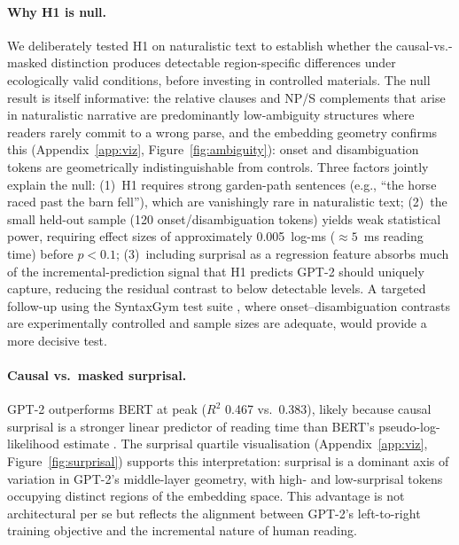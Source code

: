 \documentclass[11pt]{article}
\begin{document}
\paragraph{Why H1 is null.}
We deliberately tested H1 on naturalistic text to establish whether the causal-vs.-masked distinction produces detectable region-specific differences under ecologically valid conditions, before investing in controlled materials.
The null result is itself informative: the relative clauses and NP/S complements that arise in naturalistic narrative are predominantly low-ambiguity structures where readers rarely commit to a wrong parse, and the embedding geometry confirms this (Appendix~\ref{app:viz}, Figure~\ref{fig:ambiguity}): onset and disambiguation tokens are geometrically indistinguishable from controls.
Three factors jointly explain the null:
(1)~H1 requires strong garden-path sentences (e.g., ``the horse raced past the barn fell''), which are vanishingly rare in naturalistic text;
(2)~the small held-out sample (120 onset/disambiguation tokens) yields weak statistical power, requiring effect sizes of approximately 0.005~log-ms (${\approx}5$~ms reading time) before $p < 0.1$;
(3)~including surprisal as a regression feature absorbs much of the incremental-prediction signal that H1 predicts GPT-2 should uniquely capture, reducing the residual contrast to below detectable levels.
A targeted follow-up using the SyntaxGym test suite \citep{gauthier2020}, where onset--disambiguation contrasts are experimentally controlled and sample sizes are adequate, would provide a more decisive test.

\paragraph{Causal vs.\ masked surprisal.}
GPT-2 outperforms BERT at peak ($R^2$ 0.467 vs.\ 0.383), likely because causal surprisal is a stronger linear predictor of reading time than BERT's pseudo-log-likelihood estimate \citep{salazar2020}.
The surprisal quartile visualisation (Appendix~\ref{app:viz}, Figure~\ref{fig:surprisal}) supports this interpretation: surprisal is a dominant axis of variation in GPT-2's middle-layer geometry, with high- and low-surprisal tokens occupying distinct regions of the embedding space.
This advantage is not architectural per se but reflects the alignment between GPT-2's left-to-right training objective and the incremental nature of human reading.

\end{document}
